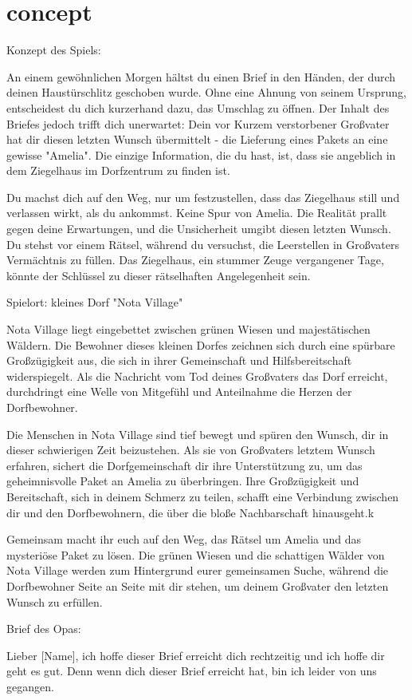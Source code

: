 \chapter{concept}
\hypertarget{md_concept}{}\label{md_concept}
Konzept des Spiels\+:

An einem gewöhnlichen Morgen hältst du einen Brief in den Händen, der durch deinen Haustürschlitz geschoben wurde. Ohne eine Ahnung von seinem Ursprung, entscheidest du dich kurzerhand dazu, das Umschlag zu öffnen. Der Inhalt des Briefes jedoch trifft dich unerwartet\+: Dein vor Kurzem verstorbener Großvater hat dir diesen letzten Wunsch übermittelt -\/ die Lieferung eines Pakets an eine gewisse "{}\+Amelia"{}. Die einzige Information, die du hast, ist, dass sie angeblich in dem Ziegelhaus im Dorfzentrum zu finden ist.

Du machst dich auf den Weg, nur um festzustellen, dass das Ziegelhaus still und verlassen wirkt, als du ankommst. Keine Spur von Amelia. Die Realität prallt gegen deine Erwartungen, und die Unsicherheit umgibt diesen letzten Wunsch. Du stehst vor einem Rätsel, während du versuchst, die Leerstellen in Großvaters Vermächtnis zu füllen. Das Ziegelhaus, ein stummer Zeuge vergangener Tage, könnte der Schlüssel zu dieser rätselhaften Angelegenheit sein.

Spielort\+: kleines Dorf "{}\+Nota Village"{}

Nota Village liegt eingebettet zwischen grünen Wiesen und majestätischen Wäldern. Die Bewohner dieses kleinen Dorfes zeichnen sich durch eine spürbare Großzügigkeit aus, die sich in ihrer Gemeinschaft und Hilfsbereitschaft widerspiegelt. Als die Nachricht vom Tod deines Großvaters das Dorf erreicht, durchdringt eine Welle von Mitgefühl und Anteilnahme die Herzen der Dorfbewohner.

Die Menschen in Nota Village sind tief bewegt und spüren den Wunsch, dir in dieser schwierigen Zeit beizustehen. Als sie von Großvaters letztem Wunsch erfahren, sichert die Dorfgemeinschaft dir ihre Unterstützung zu, um das geheimnisvolle Paket an Amelia zu überbringen. Ihre Großzügigkeit und Bereitschaft, sich in deinem Schmerz zu teilen, schafft eine Verbindung zwischen dir und den Dorfbewohnern, die über die bloße Nachbarschaft hinausgeht.\+k

Gemeinsam macht ihr euch auf den Weg, das Rätsel um Amelia und das mysteriöse Paket zu lösen. Die grünen Wiesen und die schattigen Wälder von Nota Village werden zum Hintergrund eurer gemeinsamen Suche, während die Dorfbewohner Seite an Seite mit dir stehen, um deinem Großvater den letzten Wunsch zu erfüllen.

Brief des Opas\+:

Lieber \mbox{[}Name\mbox{]}, ich hoffe dieser Brief erreicht dich rechtzeitig und ich hoffe dir geht es gut. Denn wenn dich dieser Brief erreicht hat, bin ich leider von uns gegangen. 